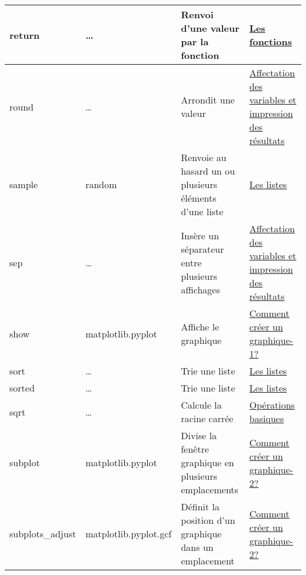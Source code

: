 \begin{longtable}{@{\extracolsep{\fill}}|p{} | p{} |p{} | p{}|@{}}
return
 & 
\ldots{}
 & 
Renvoi d'une valeur par la fonction
 & 
\href{https://pyspc.readthedocs.io/fr/latest/05-bases/05-bases/03-fonctions.html}{Les
fonctions}
\\ \hline

round
 & 
\ldots{}
 & 
Arrondit une valeur
 & 
\href{https://pyspc.readthedocs.io/fr/latest/05-bases/02-variables_input_print.html}{Affectation
des variables et impression des résultats}
\\ \hline

sample
 & 
random
 & 
Renvoie au hasard un ou plusieurs éléments d'une liste
 & 
\href{https://pyspc.readthedocs.io/fr/latest/05-bases/07-listes.html}{Les
listes}
\\ \hline

sep
 & 
\ldots{}
 & 
Insère un séparateur entre plusieurs affichages
 & 
\href{https://pyspc.readthedocs.io/fr/latest/05-bases/02-variables_input_print.html}{Affectation
des variables et impression des résultats}
\\ \hline

show
 & 
matplotlib.pyplot
 & 
Affiche le graphique
 & 
\href{https://pyspc.readthedocs.io/fr/latest/05-bases/10-graphiques_partie_1.html}{Comment
créer un graphique-1?}
\\ \hline

sort
 & 
\ldots{}
 & 
Trie une liste
 & 
\href{https://pyspc.readthedocs.io/fr/latest/05-bases/07-listes.html}{Les
listes}
\\ \hline

sorted
 & 
\ldots{}
 & 
Trie une liste
 & 
\href{https://pyspc.readthedocs.io/fr/latest/05-bases/07-listes.html}{Les
listes}
\\ \hline

sqrt
 & 
\ldots{}
 & 
Calcule la racine carrée
 & 
\href{https://pyspc.readthedocs.io/fr/latest/05-bases/04-operations_basiques.html}{Opérations
basiques}
\\ \hline

subplot
 & 
matplotlib.pyplot
 & 
Divise la fenêtre graphique en plusieurs emplacements
 & 
\href{https://pyspc.readthedocs.io/fr/latest/05-bases/10-graphiques_partie_2.html}{Comment
créer un graphique-2?}
\\ \hline

subplots\_adjust
 & 
matplotlib.pyplot.gcf
 & 
Définit la position d'un graphique dans un emplacement
 & 
\href{https://pyspc.readthedocs.io/fr/latest/05-bases/10-graphiques_partie_2.html}{Comment
créer un graphique-2?}
\\ \hline


\end{longtable}
